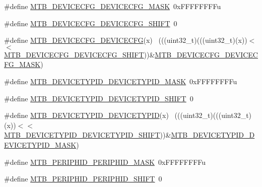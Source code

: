 \begin{DoxyCompactItemize}
\item 
\#define \hyperlink{group___m_t_b___register___masks_ga5d8dec4596fd0f32f4b71f1fbfb71aee}{M\+T\+B\+\_\+\+D\+E\+V\+I\+C\+E\+C\+F\+G\+\_\+\+D\+E\+V\+I\+C\+E\+C\+F\+G\+\_\+\+M\+A\+SK}~0x\+F\+F\+F\+F\+F\+F\+F\+Fu
\item 
\#define \hyperlink{group___m_t_b___register___masks_gac42900c87a48c38d0b310cbeb8781c81}{M\+T\+B\+\_\+\+D\+E\+V\+I\+C\+E\+C\+F\+G\+\_\+\+D\+E\+V\+I\+C\+E\+C\+F\+G\+\_\+\+S\+H\+I\+FT}~0
\item 
\#define \hyperlink{group___m_t_b___register___masks_ga10fd88b65b900c08c281f5a8aa886ddd}{M\+T\+B\+\_\+\+D\+E\+V\+I\+C\+E\+C\+F\+G\+\_\+\+D\+E\+V\+I\+C\+E\+C\+FG}(x)                          ~(((uint32\+\_\+t)(((uint32\+\_\+t)(x))$<$$<$\hyperlink{group___m_t_b___register___masks_gac42900c87a48c38d0b310cbeb8781c81}{M\+T\+B\+\_\+\+D\+E\+V\+I\+C\+E\+C\+F\+G\+\_\+\+D\+E\+V\+I\+C\+E\+C\+F\+G\+\_\+\+S\+H\+I\+FT}))\&\hyperlink{group___m_t_b___register___masks_ga5d8dec4596fd0f32f4b71f1fbfb71aee}{M\+T\+B\+\_\+\+D\+E\+V\+I\+C\+E\+C\+F\+G\+\_\+\+D\+E\+V\+I\+C\+E\+C\+F\+G\+\_\+\+M\+A\+SK})
\item 
\#define \hyperlink{group___m_t_b___register___masks_ga67e83a0bbb46ccb3456f83b4f1b39a86}{M\+T\+B\+\_\+\+D\+E\+V\+I\+C\+E\+T\+Y\+P\+I\+D\+\_\+\+D\+E\+V\+I\+C\+E\+T\+Y\+P\+I\+D\+\_\+\+M\+A\+SK}~0x\+F\+F\+F\+F\+F\+F\+F\+Fu
\item 
\#define \hyperlink{group___m_t_b___register___masks_ga233d82a0813df4ea2de5bdaf77f49b27}{M\+T\+B\+\_\+\+D\+E\+V\+I\+C\+E\+T\+Y\+P\+I\+D\+\_\+\+D\+E\+V\+I\+C\+E\+T\+Y\+P\+I\+D\+\_\+\+S\+H\+I\+FT}~0
\item 
\#define \hyperlink{group___m_t_b___register___masks_gaf3c7430d8eb0bd8a315b1e7c6ff9fe5e}{M\+T\+B\+\_\+\+D\+E\+V\+I\+C\+E\+T\+Y\+P\+I\+D\+\_\+\+D\+E\+V\+I\+C\+E\+T\+Y\+P\+ID}(x)                  ~(((uint32\+\_\+t)(((uint32\+\_\+t)(x))$<$$<$\hyperlink{group___m_t_b___register___masks_ga233d82a0813df4ea2de5bdaf77f49b27}{M\+T\+B\+\_\+\+D\+E\+V\+I\+C\+E\+T\+Y\+P\+I\+D\+\_\+\+D\+E\+V\+I\+C\+E\+T\+Y\+P\+I\+D\+\_\+\+S\+H\+I\+FT}))\&\hyperlink{group___m_t_b___register___masks_ga67e83a0bbb46ccb3456f83b4f1b39a86}{M\+T\+B\+\_\+\+D\+E\+V\+I\+C\+E\+T\+Y\+P\+I\+D\+\_\+\+D\+E\+V\+I\+C\+E\+T\+Y\+P\+I\+D\+\_\+\+M\+A\+SK})
\item 
\#define \hyperlink{group___m_t_b___register___masks_ga8be09de74be8da3de47e29838b6e7ca8}{M\+T\+B\+\_\+\+P\+E\+R\+I\+P\+H\+I\+D\+\_\+\+P\+E\+R\+I\+P\+H\+I\+D\+\_\+\+M\+A\+SK}~0x\+F\+F\+F\+F\+F\+F\+F\+Fu
\item 
\#define \hyperlink{group___m_t_b___register___masks_gaf919275fec0a218a929c0b39be8c2929}{M\+T\+B\+\_\+\+P\+E\+R\+I\+P\+H\+I\+D\+\_\+\+P\+E\+R\+I\+P\+H\+I\+D\+\_\+\+S\+H\+I\+FT}~0

\end{DoxyCompactItemize}
